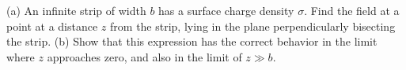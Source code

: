         (a) An infinite strip of width $b$ has a surface charge density $\sigma$.
        Find the field at a point at a distance $z$ from the strip,
        lying in the plane perpendicularly bisecting the strip.
        \answercheck\hwendpart
        (b) Show that this expression has the
        correct behavior in the limit where $z$ approaches zero,
        and also in the limit of $z\gg b$.
